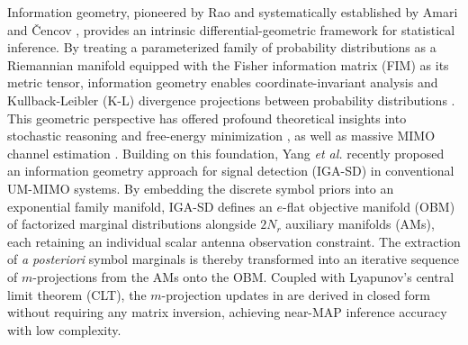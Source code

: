 \documentclass[conference]{IEEEtran}
\begin{document}
Information geometry, pioneered by Rao \cite{b18} and systematically established by Amari \cite{b19} and \v{C}encov \cite{b20}, provides an intrinsic differential-geometric framework for statistical inference. By treating a parameterized family of probability distributions as a Riemannian manifold equipped with the Fisher information matrix (FIM) as its metric tensor, information geometry enables coordinate-invariant analysis and Kullback-Leibler (K-L) divergence projections between probability distributions \cite{b19,b21,b22}. This geometric perspective has offered profound theoretical insights into stochastic reasoning and free-energy minimization \cite{b22}, as well as massive MIMO channel estimation \cite{b25,b26}. Building on this foundation, Yang \textit{et al.} \cite{b1} recently proposed an information geometry approach for signal detection (IGA-SD) in conventional UM-MIMO systems. By embedding the discrete symbol priors into an exponential family manifold, IGA-SD defines an $e$-flat objective manifold (OBM) of factorized marginal distributions alongside $2N_r$ auxiliary manifolds (AMs), each retaining an individual scalar antenna observation constraint. The extraction of \textit{a posteriori} symbol marginals is thereby transformed into an iterative sequence of $m$-projections from the AMs onto the OBM. Coupled with Lyapunov's central limit theorem (CLT), the $m$-projection updates in \cite{b1} are derived in closed form without requiring any matrix inversion, achieving near-MAP inference accuracy with low complexity.
\end{document}
